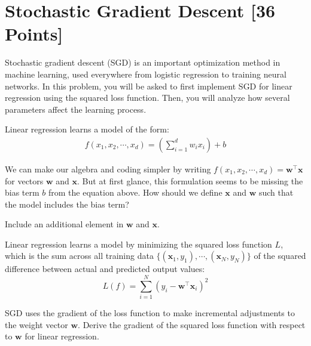 \newpage
\section{Stochastic Gradient Descent [36 Points]}

Stochastic gradient descent (SGD) is an important optimization method in machine learning, used everywhere from logistic regression to training neural networks.
In this problem, you will be asked to first implement SGD for linear regression using the squared loss function.
Then, you will analyze how several parameters affect the learning process.

Linear regression learns a model of the form:
\begin{align*}
	f(x_1, x_2, \cdots, x_d) = \left(\sum_{i=1}^d w_i x_i\right) + b
\end{align*}

\begin{problem}[2]
We can make our algebra and coding simpler by writing $f(x_1, x_2, \cdots, x_d) = \mathbf{w}^\intercal\mathbf{x}$ for vectors $\mathbf{w}$ and $\mathbf{x}$.
But at first glance, this formulation seems to be missing the bias term $b$ from the equation above.
How should we define $\mathbf{x}$ and $\mathbf{w}$ such that the model includes the bias term?
\end{problem}
\begin{hint}
	Include an additional element in $\mathbf{w}$ and $\mathbf{x}$.
\end{hint}
\begin{solution}

\end{solution}

Linear regression learns a model by minimizing the squared loss function $L$, which is the sum across all training data $\{(\mathbf{x}_1, y_1),\cdots,(\mathbf{x}_N, y_N)\}$ of the squared difference between actual and predicted output values:
\begin{equation}
	L(f) = \sum_{i=1}^N (y_i - \mathbf{w}^\intercal\mathbf{x}_i)^2
\end{equation}

\begin{problem}[2]
SGD uses the gradient of the loss function to make incremental adjustments to the weight vector $\mathbf{w}$.
Derive the gradient of the squared loss function with respect to $\mathbf{w}$ for linear regression.
\end{problem}
\begin{solution}

\end{solution}

